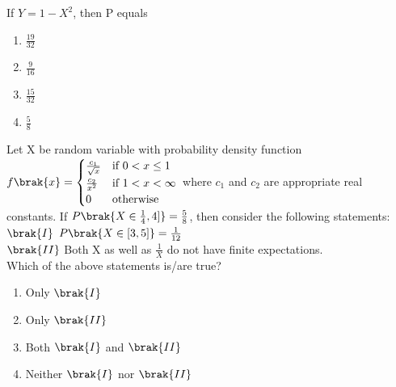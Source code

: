 If $Y=1-X^2$, then P equals
\begin{enumerate}
    \item $\frac{19}{32}$
    \item $\frac{9}{16}$
    \item $\frac{15}{32}$
    \item $\frac{5}{8}$
\end{enumerate}
\item Let X be random variable with probability density function
$f\brak{x} = 
\begin{cases} 
    \frac{c_1}{\sqrt{x}} & \text{if } 0 < x \leq 1 \\
    \frac{c_2}{x^2} & \text{if } 1 < x < \infty \\
    0 & \text{otherwise}
\end{cases}
$
where $c_1$ and $c_2$ are appropriate real constants. If $P\brak{X\in\frac{1}{4},4]}=\frac{5}{8}$, then consider the following statements:\\
$\brak{I}$ $P\brak{X \in [3,5]}=\frac{1}{12}$\\
$\brak{II}$ Both X as well as $\frac{1}{X}$ do not have finite expectations. \\
Which of the above statements is/are true?
\begin{enumerate}
    \item Only $\brak{I}$
    \item Only $\brak{II}$
    \item Both $\brak{I}$ and $\brak{II}$
    \item Neither $\brak{I}$ nor $\brak{II}$
\end{enumerate}

